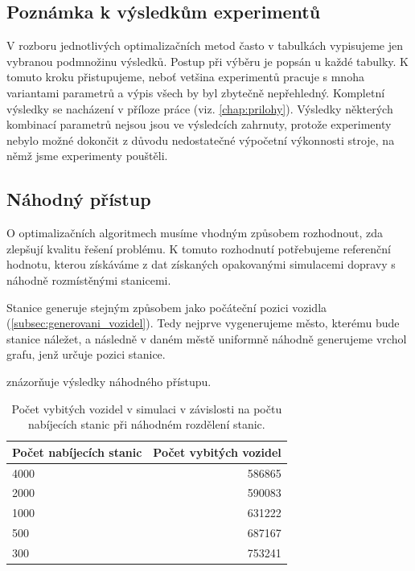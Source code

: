 \subsection{Poznámka k výsledkům experimentů}
V rozboru jednotlivých optimalizačních metod často v tabulkách vypisujeme jen
vybranou podmnožinu výsledků. Postup při výběru je popsán u každé tabulky. K tomuto kroku
přistupujeme, neboť vetšina experimentů pracuje s mnoha variantami parametrů a výpis všech 
by byl zbytečně nepřehledný. Kompletní výsledky se nacházení v příloze práce 
(viz. \cref{chap:prilohy}). Výsledky některých kombinací parametrů nejsou
jsou ve výsledcích zahrnuty, protože experimenty nebylo možné dokončit z
důvodu nedostatečné výpočetní výkonnosti stroje, na němž jsme experimenty pouštěli.


\subsection{Náhodný přístup}

O optimalizačních algoritmech musíme vhodným způsobem rozhodnout, zda zlepšují
kvalitu řešení problému. K tomuto rozhodnutí potřebujeme referenční hodnotu, kterou
získáváme z dat získaných opakovanými simulacemi dopravy s náhodně rozmístěnými
stanicemi. 

Stanice generuje stejným způsobem jako počáteční pozici vozidla 
(\cref{subsec:generovani_vozidel}). Tedy nejprve vygenerujeme město, kterému bude
stanice náležet, a následně v daném městě uniformně náhodně generujeme 
vrchol grafu, jenž určuje pozici stanice.

 znázorňuje výsledky náhodného přístupu.

\begin{table}
\centering\footnotesize\sf
\begin{tabular}{lr}
\toprule
Počet nabíjecích stanic & Počet vybitých vozidel\\
\midrule
4000 & 586865  \\
2000 & 590083 \\
1000 & 631222 \\
500 & 687167  \\
300 & 753241 \\
\bottomrule
\end{tabular}
\caption{Počet vybitých vozidel v simulaci v závislosti na počtu nabíjecích stanic při náhodném
rozdělení stanic.}
\label{tab:vysledky_nahodne}
\end{table}


